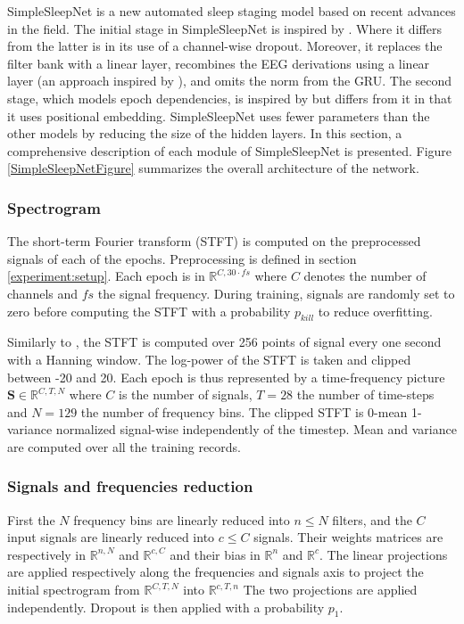 \documentclass[journal]{IEEEtran}
\begin{document}
SimpleSleepNet is a new automated sleep staging model based on recent advances in the field. The initial stage in SimpleSleepNet is inspired by \cite{Phan2019}. Where it differs from the latter is in its use of a channel-wise dropout. Moreover, it replaces the filter bank with a linear layer, recombines the EEG derivations using a linear layer (an approach inspired by  \cite{Chambon2018}), and omits the norm from the GRU. The second stage, which models epoch dependencies, is inspired by \cite{Supratak2017} but differs from it in that it uses positional embedding. SimpleSleepNet uses fewer parameters than the other models by reducing the size of the hidden layers.
In this section, a comprehensive description of each module of SimpleSleepNet is presented. Figure \ref{SimpleSleepNetFigure} summarizes the overall architecture of the network.

\subsubsection{Spectrogram}
The short-term Fourier transform (STFT)  is computed on the preprocessed signals of each of the epochs. Preprocessing is defined in section \ref{experiment:setup}. Each epoch is in $\mathbb{R}^{C, 30 \cdot  fs }$ where $C$ denotes the number of channels and $fs$ the signal frequency. During training, signals are randomly set to zero before computing the STFT with a probability $p_{kill}$ to reduce overfitting.  

Similarly to \cite{Phan2019}, the STFT is computed over 256 points of signal every one second with a Hanning window. The log-power of the STFT is taken and clipped between -20 and 20. Each epoch is thus represented by a time-frequency picture $\mathbf{S} \in \mathbb{R}^{C,T,N}$ where $C$ is the number of signals, $T = 28$ the number of time-steps  and $N = 129$ the number of frequency bins. The clipped STFT is 0-mean 1-variance normalized signal-wise independently of the timestep. Mean and variance are computed over all the training records.

\subsubsection{Signals and frequencies reduction}
First the $N$ frequency bins are linearly reduced into $n \leq N$ filters, and the $C$ input signals are linearly reduced into $c \leq C$ signals. Their weights matrices are respectively in $\mathbb{R}^{n,N}$ and $\mathbb{R}^{c,C}$ and their bias in $\mathbb{R}^n$ and $\mathbb{R}^c$. The linear projections are applied respectively along the frequencies and signals axis to project the initial spectrogram from $\mathbb{R}^{C,T,N}$ into $\mathbb{R}^{c,T,n}$
The two projections are applied independently. Dropout is then applied with a probability $p_1$.
\end{document}
